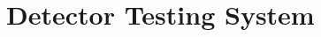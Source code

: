 \documentclass[journal]{IEEEtran}
\begin{document}

\section{\label{sec:testing_system}{Detector Testing System}}
\end{document}
